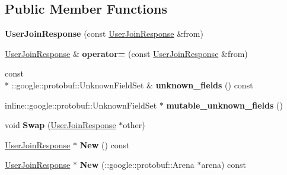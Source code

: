 \subsection*{Public Member Functions}
\begin{DoxyCompactItemize}
\item 
\hypertarget{classSimpleChat_1_1UserJoinResponse_a6ac5c504a53a80a0bd9b8135c83743e3}{{\bfseries User\-Join\-Response} (const \hyperlink{classSimpleChat_1_1UserJoinResponse}{User\-Join\-Response} \&from)}\label{classSimpleChat_1_1UserJoinResponse_a6ac5c504a53a80a0bd9b8135c83743e3}

\item 
\hypertarget{classSimpleChat_1_1UserJoinResponse_a7b819a45d55784fa256405d0a09ed471}{\hyperlink{classSimpleChat_1_1UserJoinResponse}{User\-Join\-Response} \& {\bfseries operator=} (const \hyperlink{classSimpleChat_1_1UserJoinResponse}{User\-Join\-Response} \&from)}\label{classSimpleChat_1_1UserJoinResponse_a7b819a45d55784fa256405d0a09ed471}

\item 
\hypertarget{classSimpleChat_1_1UserJoinResponse_a820b6d83a86ef347ce85fda4bdf322bd}{const \\*
\-::google\-::protobuf\-::\-Unknown\-Field\-Set \& {\bfseries unknown\-\_\-fields} () const }\label{classSimpleChat_1_1UserJoinResponse_a820b6d83a86ef347ce85fda4bdf322bd}

\item 
\hypertarget{classSimpleChat_1_1UserJoinResponse_a23f46f596005774a0873d889b00f97c5}{inline\-::google\-::protobuf\-::\-Unknown\-Field\-Set $\ast$ {\bfseries mutable\-\_\-unknown\-\_\-fields} ()}\label{classSimpleChat_1_1UserJoinResponse_a23f46f596005774a0873d889b00f97c5}

\item 
\hypertarget{classSimpleChat_1_1UserJoinResponse_ab94a5f942a0e4a200c8351b0cbd36020}{void {\bfseries Swap} (\hyperlink{classSimpleChat_1_1UserJoinResponse}{User\-Join\-Response} $\ast$other)}\label{classSimpleChat_1_1UserJoinResponse_ab94a5f942a0e4a200c8351b0cbd36020}

\item 
\hypertarget{classSimpleChat_1_1UserJoinResponse_aa2e8a1085ae0fcb0b672776215d696c2}{\hyperlink{classSimpleChat_1_1UserJoinResponse}{User\-Join\-Response} $\ast$ {\bfseries New} () const }\label{classSimpleChat_1_1UserJoinResponse_aa2e8a1085ae0fcb0b672776215d696c2}

\item 
\hypertarget{classSimpleChat_1_1UserJoinResponse_a96d7e67a29afa3393dc80fc3a61ff7e7}{\hyperlink{classSimpleChat_1_1UserJoinResponse}{User\-Join\-Response} $\ast$ {\bfseries New} (\-::google\-::protobuf\-::\-Arena $\ast$arena) const }\label{classSimpleChat_1_1UserJoinResponse_a96d7e67a29afa3393dc80fc3a61ff7e7}


\end{DoxyCompactItemize}
